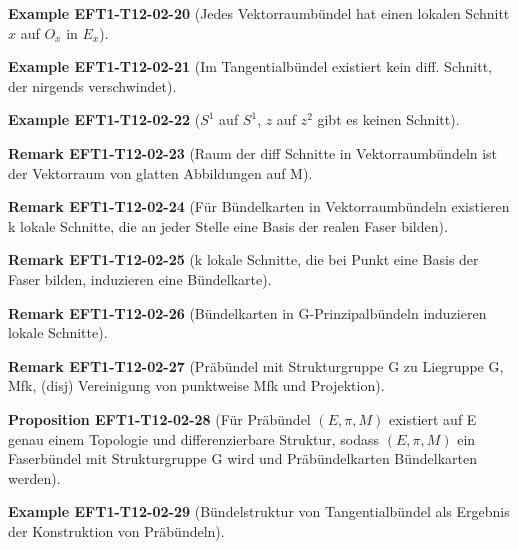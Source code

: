 \documentclass[10pt, letterpaper]{article}
\newcommand{\CustomHeading}[3]{%
  \par\medskip\noindent%
  \textbf{#1 #2} \textnormal{(#3)}.\enskip%
}
\newenvironment{PROP}[2]{\CustomHeading{Proposition}{#1}{#2}}{}
\newenvironment{REM}[2]{\CustomHeading{Remark}{#1}{#2}}{}
\newenvironment{EXA}[2]{\CustomHeading{Example}{#1}{#2}}{}
\begin{document}
\begin{EXA}{EFT1-T12-02-20}{Jedes Vektorraumbündel hat einen lokalen Schnitt $x$ auf $O_x$ in $E_x$}
\end{EXA}

\begin{EXA}{EFT1-T12-02-21}{Im Tangentialbündel existiert kein diff. Schnitt, der nirgends verschwindet}
\end{EXA}

\begin{EXA}{EFT1-T12-02-22}{$S^1$ auf $S^1$, $z$ auf $z^2$ gibt es keinen Schnitt}
\end{EXA}

\begin{REM}{EFT1-T12-02-23}{Raum der diff Schnitte in Vektorraumbündeln ist der Vektorraum von glatten Abbildungen auf M}
\end{REM}

\begin{REM}{EFT1-T12-02-24}{Für Bündelkarten in Vektorraumbündeln existieren k lokale Schnitte, die an jeder Stelle eine Basis der realen Faser bilden}
\end{REM}

\begin{REM}{EFT1-T12-02-25}{k lokale Schnitte, die bei Punkt eine Basis der Faser bilden, induzieren eine Bündelkarte}
\end{REM}

\begin{REM}{EFT1-T12-02-26}{Bündelkarten in G-Prinzipalbündeln induzieren lokale Schnitte}
\end{REM}

\begin{REM}{EFT1-T12-02-27}{Präbündel mit Strukturgruppe G zu Liegruppe G, Mfk, (disj) Vereinigung von punktweise Mfk und Projektion}
\end{REM}

\begin{PROP}{EFT1-T12-02-28}{Für Präbündel $(E,\pi,M)$ existiert auf E genau einem Topologie und differenzierbare Struktur, sodass $(E,\pi,M)$ ein Faserbündel mit Strukturgruppe G wird und Präbündelkarten Bündelkarten werden}
\end{PROP}

\begin{EXA}{EFT1-T12-02-29}{Bündelstruktur von Tangentialbündel als Ergebnis der Konstruktion von Präbündeln}
\end{EXA}
\end{document}
